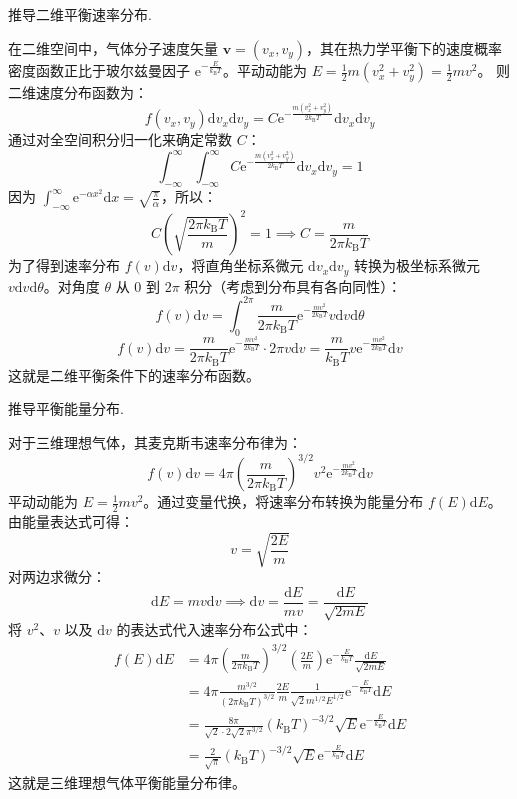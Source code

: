 \begin{exercise}\label{ex:13.7}
推导二维平衡速率分布.
\end{exercise}
\begin{solution}
在二维空间中，气体分子速度矢量 $\boldsymbol{v} = (v_x, v_y)$，其在热力学平衡下的速度概率密度函数正比于玻尔兹曼因子 $\mathrm{e}^{-\frac{E}{k_{\mathrm{B}}T}}$。平动动能为 $E = \frac{1}{2}m(v_x^2 + v_y^2) = \frac{1}{2}mv^2$。
则二维速度分布函数为：
$$ f(v_x, v_y) \mathrm{d}v_x \mathrm{d}v_y = C \mathrm{e}^{-\frac{m(v_x^2 + v_y^2)}{2k_{\mathrm{B}}T}} \mathrm{d}v_x \mathrm{d}v_y $$
通过对全空间积分归一化来确定常数 $C$：
$$ \int_{-\infty}^{\infty} \int_{-\infty}^{\infty} C \mathrm{e}^{-\frac{m(v_x^2 + v_y^2)}{2k_{\mathrm{B}}T}} \mathrm{d}v_x \mathrm{d}v_y = 1 $$
因为 $\int_{-\infty}^{\infty} \mathrm{e}^{-\alpha x^2} \mathrm{d}x = \sqrt{\frac{\pi}{\alpha}}$，所以：
$$ C \left( \sqrt{\frac{2\pi k_{\mathrm{B}} T}{m}} \right)^2 = 1 \implies C = \frac{m}{2\pi k_{\mathrm{B}} T} $$
为了得到速率分布 $f(v)\mathrm{d}v$，将直角坐标系微元 $\mathrm{d}v_x \mathrm{d}v_y$ 转换为极坐标系微元 $v \mathrm{d}v \mathrm{d}\theta$。对角度 $\theta$ 从 $0$ 到 $2\pi$ 积分（考虑到分布具有各向同性）：
$$ f(v) \mathrm{d}v = \int_0^{2\pi} \frac{m}{2\pi k_{\mathrm{B}} T} \mathrm{e}^{-\frac{mv^2}{2k_{\mathrm{B}}T}} v \mathrm{d}v \mathrm{d}\theta $$
$$ f(v) \mathrm{d}v = \frac{m}{2\pi k_{\mathrm{B}} T} \mathrm{e}^{-\frac{mv^2}{2k_{\mathrm{B}}T}} \cdot 2\pi v \mathrm{d}v = \frac{m}{k_{\mathrm{B}} T} v \mathrm{e}^{-\frac{mv^2}{2k_{\mathrm{B}}T}} \mathrm{d}v $$
这就是二维平衡条件下的速率分布函数。
\end{solution}

\begin{exercise}\label{ex:13.8}
推导平衡能量分布.
\end{exercise}
\begin{solution}
对于三维理想气体，其麦克斯韦速率分布律为：
$$ f(v) \mathrm{d}v = 4\pi \left(\frac{m}{2\pi k_{\mathrm{B}} T}\right)^{3/2} v^2 \mathrm{e}^{-\frac{mv^2}{2k_{\mathrm{B}}T}} \mathrm{d}v $$
平动动能为 $E = \frac{1}{2}mv^2$。通过变量代换，将速率分布转换为能量分布 $f(E)\mathrm{d}E$。
由能量表达式可得：
$$ v = \sqrt{\frac{2E}{m}} $$
对两边求微分：
$$ \mathrm{d}E = mv \mathrm{d}v \implies \mathrm{d}v = \frac{\mathrm{d}E}{mv} = \frac{\mathrm{d}E}{\sqrt{2mE}} $$
将 $v^2$、$v$ 以及 $\mathrm{d}v$ 的表达式代入速率分布公式中：
\begin{align*}
    f(E) \mathrm{d}E &= 4\pi \left(\frac{m}{2\pi k_{\mathrm{B}} T}\right)^{3/2} \left(\frac{2E}{m}\right) \mathrm{e}^{-\frac{E}{k_{\mathrm{B}}T}} \frac{\mathrm{d}E}{\sqrt{2mE}} \\
    &= 4\pi \frac{m^{3/2}}{(2\pi k_{\mathrm{B}} T)^{3/2}} \frac{2E}{m} \frac{1}{\sqrt{2} m^{1/2} E^{1/2}} \mathrm{e}^{-\frac{E}{k_{\mathrm{B}}T}} \mathrm{d}E \\
    &= \frac{8\pi}{\sqrt{2} \cdot 2\sqrt{2} \pi^{3/2}} (k_{\mathrm{B}} T)^{-3/2} \sqrt{E} \mathrm{e}^{-\frac{E}{k_{\mathrm{B}}T}} \mathrm{d}E \\
    &= \frac{2}{\sqrt{\pi}} (k_{\mathrm{B}} T)^{-3/2} \sqrt{E} \mathrm{e}^{-\frac{E}{k_{\mathrm{B}}T}} \mathrm{d}E
\end{align*}
这就是三维理想气体平衡能量分布律。
\end{solution}

